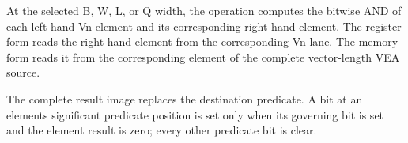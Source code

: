 At the selected B, W, L, or Q width, the operation computes the bitwise AND of
each left-hand Vn element and its corresponding right-hand element. The
register form reads the right-hand element from the corresponding Vn lane. The
memory form reads it from the corresponding element of the complete
vector-length VEA source.

The complete result image replaces the destination predicate. A bit at an
element\textquotesingle{}s significant predicate position is set only when its governing bit is
set and the element result is zero; every other predicate bit is clear.
